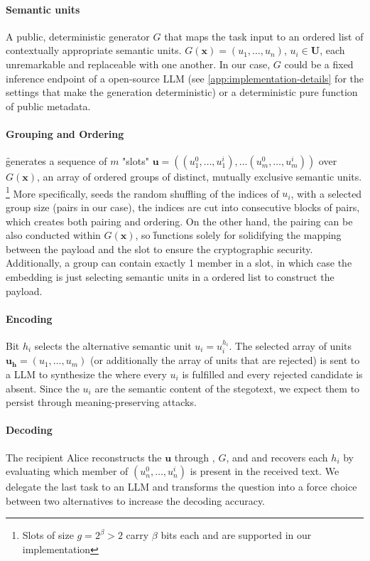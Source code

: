 \paragraph{Semantic units}
A public, deterministic generator $G$ that maps the task input \inp to an ordered list of contextually appropriate semantic units.
$G(\mathbf{x}) = (u_1,\ldots,u_n)$, $u_i \in \mathbf{U}$, each unremarkable and replaceable with one another.
In our case, $G$ could be a fixed inference endpoint of a open-source LLM (see \autoref{app:implementation-details} for the settings that make the generation deterministic) or a deterministic pure function of public metadata.

\paragraph{Grouping and Ordering}
\f generates a sequence of $m$ "slots" $\mathbf{u} = ((u_1^{0}, \ldots, u_1^{i}),\ldots(u_m^{0}, \ldots, u_m^{i}))$ over $G(\mathbf{x})$, an array of ordered groups of distinct, mutually exclusive semantic units. \footnote{Slots of size $g = 2^\beta > 2$ carry $\beta$ bits each and are supported in our implementation}
More specifically, \key seeds the random shuffling of the indices of $u_i$, with a selected group size (pairs in our case), the indices are cut into consecutive blocks of pairs, which creates both pairing and ordering.
On the other hand, the pairing can be also conducted within $G(\mathbf{x})$, so \f functions solely for solidifying the mapping between the payload and the slot to ensure the cryptographic security.
Additionally, a group can contain exactly 1 member in a slot, in which case the embedding is just selecting semantic units in a ordered list to construct the payload.

\paragraph{Encoding}
Bit $h_i$ selects the alternative semantic unit $u_i = u_i^{h_i}$.
The selected array of units $\mathbf{u_h} = (u_1, \dots, u_m)$ (or additionally the array of units that are rejected) is sent to a LLM to synthesize the \stegotext where every $u_i$ is fulfilled and every rejected candidate is absent.
Since the $u_i$ are the semantic content of the stegotext, we expect them to persist through meaning-preserving attacks.

\paragraph{Decoding}
The recipient Alice reconstructs the $\mathbf{u}$ through \key, $G$, and \inp and recovers each $h_i$ by evaluating which member of $(u_n^{0}, \ldots, u_n^{i})$ is present in the received text.
We delegate the last task to an LLM and transforms the question into a force choice between two alternatives to increase the decoding accuracy.


